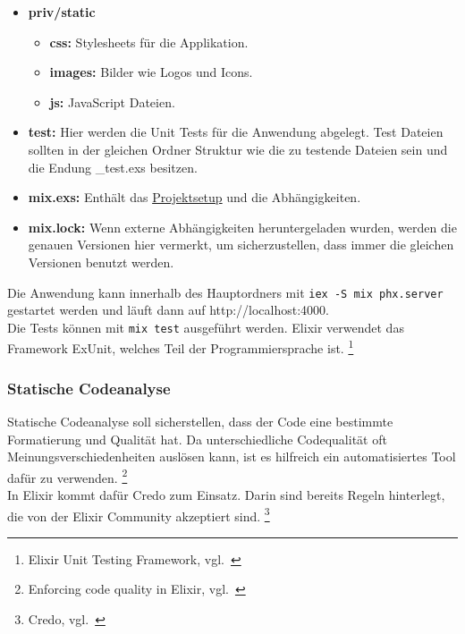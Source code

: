 \begin{itemize}
\begin{itemize}
\begin{itemize}
        \end{itemize}
    \end{itemize}
    \item \textbf{priv/static}
    \begin{itemize}
        \item \textbf{css:} Stylesheets für die Applikation.
        \item \textbf{images:} Bilder wie Logos und Icons.
        \item \textbf{js:} JavaScript Dateien.
    \end{itemize}
    \item \textbf{test:} Hier werden die Unit Tests für die Anwendung abgelegt. Test Dateien sollten in der gleichen Ordner Struktur wie die zu testende Dateien sein und die Endung \_test.exs besitzen.
    \item \textbf{mix.exs:} Enthält das \hyperref[lst:projekt_mixfile]{Projektsetup} und die Abhängigkeiten.
    \item \textbf{mix.lock:} Wenn externe Abhängigkeiten heruntergeladen wurden, werden die genauen Versionen hier vermerkt, um sicherzustellen, dass immer die gleichen Versionen benutzt werden.
\end{itemize}

Die Anwendung kann innerhalb des Hauptordners mit \texttt{iex -S mix phx.server} gestartet werden und läuft dann auf http://localhost:4000. \\

Die Tests können mit \texttt{mix test} ausgeführt werden.
Elixir verwendet das Framework ExUnit, welches Teil der Programmiersprache ist.
\footnote{{Elixir Unit Testing Framework, vgl.~\cite{ELIXIR_UNIT_TESTING}}}


\subsubsection{Statische Codeanalyse}

Statische Codeanalyse soll sicherstellen, dass der Code eine bestimmte Formatierung und Qualität hat.
Da unterschiedliche Codequalität oft Meinungsverschiedenheiten auslösen kann, ist es hilfreich ein automatisiertes Tool dafür zu verwenden.
\footnote{{Enforcing code quality in Elixir, vgl.~\cite{ELIXIR_CODE_QUALITY}}} \\

In Elixir kommt dafür Credo zum Einsatz.
Darin sind bereits Regeln hinterlegt, die von der Elixir Community akzeptiert sind.
\footnote{{Credo, vgl.~\cite{ELIXIR_CREDO}}} \\


